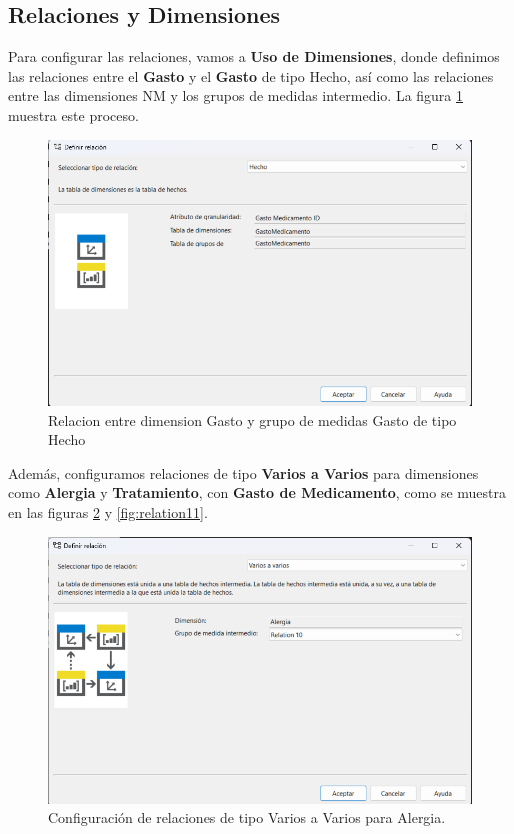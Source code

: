 \documentclass{article}
\begin{document}
\subsection{Relaciones y Dimensiones}
Para configurar las relaciones, vamos a \textbf{Uso de Dimensiones}, donde definimos las relaciones entre el \textbf{Gasto} y el \textbf{Gasto}  de tipo Hecho, así como las relaciones entre las dimensiones NM y los grupos de medidas intermedio. La figura \ref{fig:uso_hecho} muestra este proceso.

\begin{figure}[H]
	\begin{center} 
		\includegraphics[width=.7\textwidth]{images/uso_hecho.png} 
		\caption{Relacion entre dimension Gasto y grupo de medidas Gasto de tipo Hecho}
		\label{fig:uso_hecho}
	\end{center}
\end{figure}

Además, configuramos relaciones de tipo \textbf{Varios a Varios} para dimensiones como \textbf{Alergia} y \textbf{Tratamiento}, con \textbf{Gasto de Medicamento}, como se muestra en las figuras \ref{fig:relation10} y \ref{fig:relation11}.

\begin{figure}[H]
	\begin{center} 
		\includegraphics[width=.7\textwidth]{images/relation10.png}
		\caption{Configuración de relaciones de tipo Varios a Varios para Alergia.}
		\label{fig:relation10}
	\end{center}
\end{figure}
\end{document}
